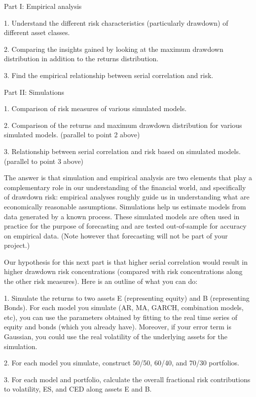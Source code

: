 \documentclass[11pt]{article}
\begin{document}
Part I: Empirical analysis

1. Understand the different risk characteristics (particularly drawdown) of different asset classes.

2. Comparing the insights gained by looking at the maximum drawdown distribution in addition to the returns distribution.

3. Find the empirical relationship between serial correlation and risk.


Part II: Simulations

1. Comparison of risk measures of various simulated models.

2. Comparison of the returns and maximum drawdown distribution for various simulated models. (parallel to point 2 above)

3. Relationship between serial correlation and risk based on simulated models. (parallel to point 3 above)


The answer is that simulation and empirical analysis are two elements that play a complementary role in our understanding of the financial world, and specifically of drawdown risk: empirical analyses roughly guide us in understanding what are economically reasonable assumptions. Simulations help us estimate models from data generated by a known process. These simulated models are often used in practice for the purpose of forecasting and are tested out-of-sample for accuracy on empirical data. (Note however that forecasting will not be part of your project.)


Our hypothesis for this next part is that higher serial correlation would result in higher drawdown risk concentrations (compared with risk concentrations along the other risk measures). Here is an outline of what you can do:

1. Simulate the returns to two assets E (representing equity) and B (representing Bonds). For each model you simulate (AR, MA, GARCH, combination models, etc), you can use the parameters obtained by fitting to the real time series of equity and bonds (which you already have). Moreover, if your error term is Gaussian, you could use the real volatility of the underlying assets for the simulation.

2. For each model you simulate, construct 50/50, 60/40, and 70/30 portfolios.

3. For each model and portfolio, calculate the overall fractional risk contributions to volatility, ES, and CED along assets E and B.
\end{document}
